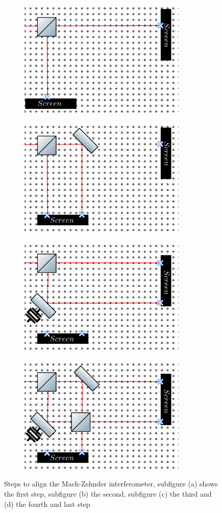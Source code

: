 \documentclass[12pt]{book}
\begin{document}
\begin{figure}[H]
\centering
\begin{subfigure}[b]{0.55\linewidth}
\includegraphics[width=8cm,height=4 cm]{images/first_step.png}
\caption{}
\label{fig:BS1}
\end{subfigure}
\begin{subfigure}[b]{0.55\linewidth}
\includegraphics[width=8cm,height=4 cm]{images/second_step.png}
\caption{}
\label{fig:BS1}
\end{subfigure}
\begin{subfigure}[b]{0.55\linewidth}
\includegraphics[width=8cm,height=4 cm]{images/third_step.png}
\caption{}
\label{fig:BS1}
\end{subfigure}
\begin{subfigure}[b]{0.55\linewidth}
\includegraphics[width=8cm,height=4 cm]{images/last_step.png}
\caption{}
\label{fig:westminster_aerea}
\end{subfigure}
\caption{Steps to align the Mach-Zehnder interferometer, subfigure (a) shows the first step, subfigure (b) the second, subfigure (c) the third and (d) the fourth and last step}
\label{steps}
\end{figure}
\end{document}
